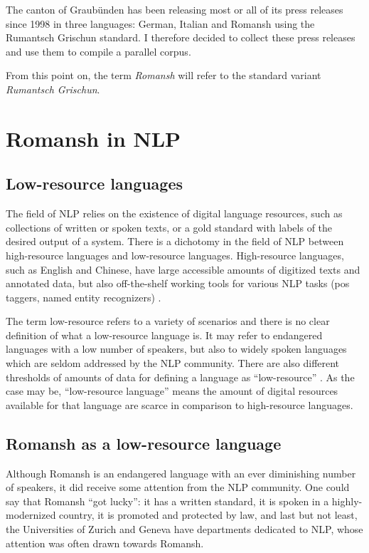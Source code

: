The canton of Graubünden has been releasing most or all of its press releases since 1998 in three languages: German, Italian and Romansh using the Rumantsch Grischun standard. 
I therefore decided to collect these press releases and use them to compile a parallel corpus. 

From this point on, the term \emph{Romansh} will refer to the standard variant \emph{Rumantsch Grischun}.

\section{Romansh in NLP}
\subsection{Low-resource languages}
The field of \acrfull{NLP} relies on the existence of digital language resources, such as collections of written or spoken texts, or a gold standard with labels of the desired output of a system. 
There is a dichotomy in the field of \acrshort{NLP} between high-resource languages and low-resource languages. 
High-resource languages, such as English and Chinese, have large accessible amounts of digitized texts and annotated data, but also  off-the-shelf working tools for various NLP tasks (\acrshort{pos} taggers, named entity recognizers) \autocite{bender-2019}.

The term low-resource refers to a variety of scenarios and there is no  clear definition of what a low-resource language is. 
It may refer to endangered languages with a low number of speakers, but also to widely spoken languages which are seldom addressed by the NLP community. 
There are also different thresholds of amounts of data for defining a language as \enquote{low-resource} \autocite{hedderich-etal-2021-survey}. 
As the case may be, \enquote{low-resource language} means the amount of digital resources available for that language are scarce in comparison to high-resource languages.

\subsection{Romansh as a low-resource language}
Although Romansh is an endangered language with an ever diminishing number of speakers, it did receive some attention from the NLP community.
One could say that Romansh \enquote{got lucky}: it has a written standard, it is spoken in a highly-modernized country, it is promoted and protected by law, and last but not least, the Universities of Zurich and Geneva have departments dedicated to NLP, whose attention was often drawn towards Romansh.


